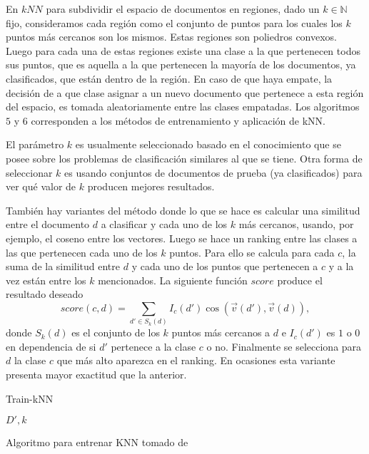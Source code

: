 \documentclass{llncs}
\begin{document}
		En $kNN$ para subdividir el espacio de documentos en regiones, dado un $k \in \mathbb{N}$ fijo, consideramos cada regi\'on como el conjunto de puntos para los cuales los $k$ puntos m\'as cercanos son los mismos. Estas regiones son poliedros convexos. Luego para cada una de estas regiones existe una clase a la que pertenecen todos sus puntos, que es aquella a la que pertenecen la mayor\'ia de los documentos, ya clasificados, que est\'an dentro de la regi\'on. En caso de que haya empate, la decisi\'on de a que clase asignar a un nuevo documento que pertenece a esta regi\'on del espacio, es tomada aleatoriamente entre las clases empatadas. Los algoritmos $5$ y $6$ corresponden a los m\'etodos de entrenamiento y aplicaci\'on de kNN. 
		
		El par\'ametro $k$ es usualmente seleccionado basado en el conocimiento que se posee sobre los problemas de clasificaci\'on similares al que se tiene. Otra forma de seleccionar $k$ es usando conjuntos de documentos de prueba (ya clasificados) para ver qu\'e valor de $k$ producen mejores resultados.
		
		Tambi\'en hay variantes del m\'etodo donde lo que se hace es calcular una similitud entre el documento $d$ a clasificar y cada uno de los $k$ m\'as cercanos, usando, por ejemplo, el coseno entre los vectores. Luego se hace un ranking entre las clases a las que pertenecen cada uno de los $k$ puntos. Para ello se calcula para cada $c$, la suma de la similitud entre $d$ y cada uno de los puntos que pertenecen a $c$ y a la vez est\'an entre los $k$ mencionados. La siguiente funci\'on $score$ produce el resultado deseado
		\[
			score(c,d)  = \sum_{d'\in S_k(d)} I_c(d') \cos(\overrightarrow{v}(d'),\overrightarrow{v}(d)),
		\]
		donde $S_k(d)$ es el conjunto de los $k$ puntos m\'as cercanos a $d$ e $I_c(d')$ es $1$ o $0$ en dependencia de si $d'$ pertenece a la clase $c$ o no. Finalmente se selecciona para $d$ la clase $c$ que m\'as alto aparezca en el ranking. En ocasiones esta variante presenta mayor exactitud que la anterior.
		
		
		\begin{algorithm}{}
			\caption{Train-kNN}
			\begin{algorithmic}[1]
				
				\State \textbf{\Return} $D', k$
			\end{algorithmic}
			
			\smallskip
			\tiny{Algoritmo para entrenar KNN tomado de \cite[Figura 14.7]{B1}}
		\end{algorithm}
		
\end{document}
